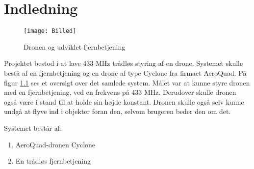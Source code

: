 \documentclass[Main]{subfiles}
\begin{document}
\chapter{Indledning}

\begin{figure}[H]
\centering
\texttt{[image: Billed]}
\caption{Dronen og udviklet fjernbetjening}
\label{Fig:Billed}
\end{figure}


Projektet bestod i at lave 433 MHz trådløs styring af en drone.
Systemet skulle bestå af en fjernbetjening og en drone af type Cyclone fra firmaet AeroQuad\cite{AQ-store}. 
På figur \ref{Fig:Billed} ses et oversigt over det samlede system. 
Målet var at kunne styre dronen med en fjernbetjening, ved en frekvens på 433 MHz. 
Derudover skulle dronen også være i stand til at holde sin højde konstant. 
Dronen skulle også selv kunne undgå at flyve ind i objekter foran den, selvom brugeren beder den om det.

Systemet består af:
\vspace{-10pt}
\begin{enumerate}
\item AeroQuad-dronen Cyclone
\item En trådløs fjernbetjening
\end{enumerate}
\end{document}
